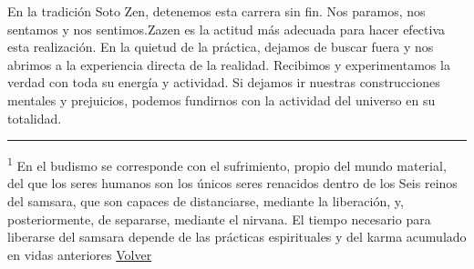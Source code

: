 \documentclass[
  a5paperpaper,
]{article}
\begin{document}
En la tradición Soto Zen, detenemos esta carrera sin fin. Nos paramos,
nos sentamos y nos sentimos.Zazen es la actitud más adecuada para hacer
efectiva esta realización. En la quietud de la práctica, dejamos de
buscar fuera y nos abrimos a la experiencia directa de la realidad.
Recibimos y experimentamos la verdad con toda su energía y actividad. Si
dejamos ir nuestras construcciones mentales y prejuicios, podemos
fundirnos con la actividad del universo en su totalidad.

\hfill\break

\begin{center}\rule{0.5\linewidth}{0.5pt}\end{center}

\leavevmode{}%
\textsuperscript{1} En el budismo se corresponde con el sufrimiento,
propio del mundo material, del que los seres humanos son los únicos
seres renacidos dentro de los Seis reinos del samsara, que son capaces
de distanciarse, mediante la liberación, y, posteriormente, de
separarse, mediante el nirvana. El tiempo necesario para liberarse del
samsara depende de las prácticas espirituales y del karma acumulado en
vidas anteriores \protect\hyperlink{ref1}{Volver}

\hfill\break
\end{document}
